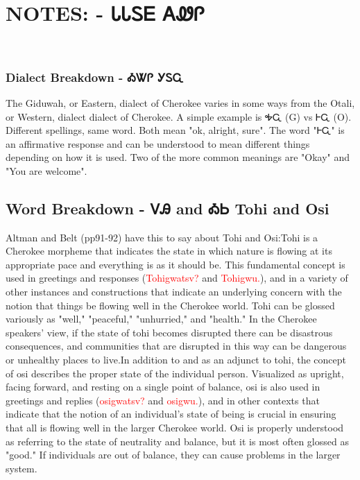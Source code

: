 \chapter{NOTES: - ᏓᏓᏚᎬ ᎪᏪᎵ 
}
\
\subsection{Dialect Breakdown - ᎣᏔᎵ  ᎩᏚᏩ}
The Giduwah, or Eastern, dialect of Cherokee varies in some ways from the Otali, or Western, dialect dialect of Cherokee.  A simple example is ᎭᏩ (G) vs ᎰᏩ (O).  Different spellings, same word.  Both mean "ok, alright, sure".  The word "ᎰᏩ" is an affirmative response and can be understood to mean different things depending on how it is used. Two of the more common meanings are "Okay" and "You are welcome".\cite{joynerlesson4}

\label{sec:wordBreakdownTohiOsi}\section{Word Breakdown - ᏙᎯ and ᎣᏏ Tohi and Osi}Altman and Belt (pp91-92) have this to say about Tohi and Osi:Tohi is a Cherokee morpheme that indicates the state in which nature is flowing at its appropriate pace and everything is as it should be. This fundamental concept is used in greetings and responses (\textcolor{red}{Tohigwatsv?} and \textcolor{red}{Tohigwu.}), and in a variety of other instances and constructions that indicate an underlying concern with the notion that things be flowing well in the Cherokee world. Tohi can be glossed variously as "well," "peaceful," "unhurried," and "health." In the Cherokee speakers' view, if the state of tohi becomes disrupted there can be disastrous consequences, and communities that are disrupted in this way can be dangerous or unhealthy places to live.In addition to and as an adjunct to tohi, the concept of osi describes the proper state of the individual person. Visualized as upright, facing forward, and resting on a single point of balance, osi is also used in greetings and replies (\textcolor{red}{osigwatsv?} and \textcolor{red}{osigwu.}), and in other contexts that indicate that the notion of an individual’s state of being is crucial in ensuring that all is flowing well in the larger Cherokee world. Osi is properly understood as referring to the state of neutrality and balance, but it is most often glossed as "good." If individuals are out of balance, they can cause problems in the larger system.\cite{altmanBelt90-98}

